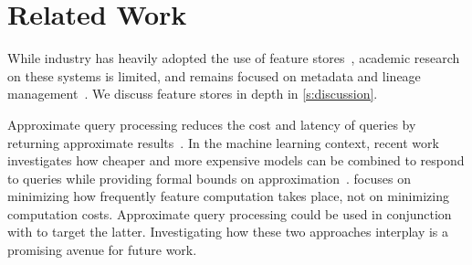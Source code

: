 \section{Related Work}
\label{s:related-work}

 While industry has heavily adopted the use of feature stores~\cite{tecton,hopsworks}, academic research on these systems is limited, and remains focused on metadata and lineage management~\cite{kakantousis2019horizontally}. We discuss feature stores in depth in \cref{s:discussion}.


 Approximate query processing reduces the cost and latency of queries by returning approximate results~\cite{agarwal2013blinkdb,chaudhuri2017aqp}. In the machine learning context, recent work investigates how cheaper and more expensive models can be combined to respond to queries \cite{kang2017noscope} while providing formal bounds on approximation~\cite{kang2020approximate}. \system{} focuses on minimizing how frequently feature computation takes place, not on minimizing computation costs. Approximate query processing could be used in conjunction with \system{} to target the latter. Investigating how these two approaches interplay is a promising avenue for future work. 


